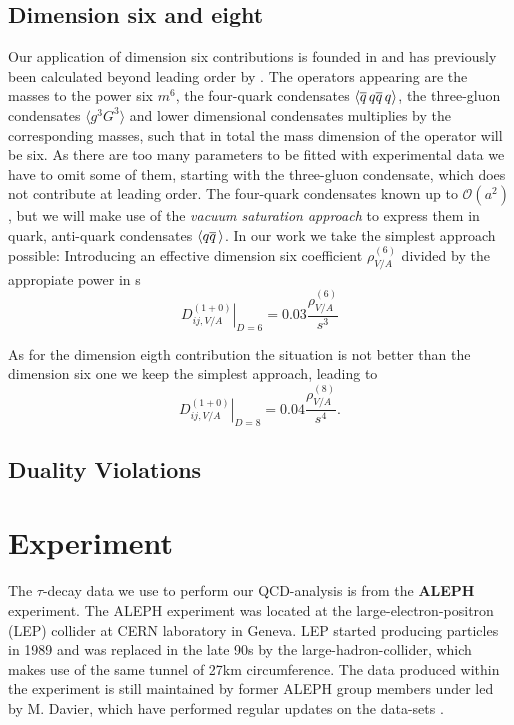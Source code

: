 \documentclass[../../index.tex]{subfiles}
\begin{document}
\subsection{Dimension six and eight}
Our application of dimension six contributions is founded in \cite{Braaten1991}
and has previously been calculated beyond leading order by \cite{Lanin1986}.
The operators appearing are the masses to the power six $m^6$, the four-quark
condensates $\langle \overline{q}\, q \overline{q}\, q \rangle$, the three-gluon condensates
$\langle g^3 G^3 \rangle$ and lower dimensional condensates multiplies by the
corresponding masses, such that in total the mass dimension of the operator will
be six.
As there are too many parameters to be fitted with experimental data we have to
omit some of them, starting with the three-gluon condensate, which does not
contribute at leading order. The four-quark condensates known up to
$\mathcal{O}(a^2)$, but we will make use of the \textit{vacuum saturation
  approach} \cite{Beneke2008,Braaten1991,Shifman1978} to express them in quark, anti-quark condensates $\langle q \overline{q}\, \rangle$.
In our work we take the simplest approach possible: Introducing an effective
dimension six coefficient $\rho_{V/A}^{(6)}$ divided by the appropiate power in s
\begin{equation}
  \left. D_{ij,V/A}^{(1+0)} \right\rvert_{D=6} = 0.03 \frac{\rho_{V/A}^{(6)}}{s^3}
\end{equation}

As for the dimension eigth contribution the situation is not better than the
dimension six one we keep the simplest approach, leading to
\begin{equation}
  \left. D_{ij,V/A}^{(1+0)} \right\rvert_{D=8} = 0.04 \frac{\rho_{V/A}^{(8)}}{s^4}.
\end{equation}


\subsection{Duality Violations}


\section{Experiment}
The $\tau$-decay data we use to perform our QCD-analysis is from the
\textbf{ALEPH} experiment. The ALEPH experiment was located at the
large-electron-positron (LEP) collider at CERN laboratory in Geneva. LEP started
producing particles in 1989 and was replaced in the late 90s by the
large-hadron-collider, which makes use of the same tunnel of 27km circumference.
The data produced within the experiment is still maintained by former ALEPH
group members under led by M. Davier, which have performed regular updates on
the data-sets \cite{Davier2013,Davier2008,Aleph2005}.
\end{document}
